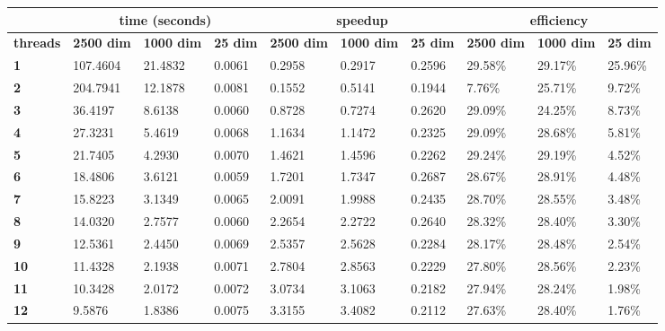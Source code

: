 \begin{table}[ht]
\centering
\begin{tabular}{l|l|l|l|l|l|l|l|l|l|}
\cline{2-10}
\multicolumn{1}{c|}{\textbf{}} & \multicolumn{3}{c|}{\textbf{time (seconds)}} & \multicolumn{3}{c|}{\textbf{speedup}} & \multicolumn{3}{c|}{\textbf{efficiency}} \\ \hline
\multicolumn{1}{|l|}{\textbf{threads}} & \textbf{2500 dim} & \textbf{1000 dim} & \textbf{25 dim} & \textbf{2500 dim} & \textbf{1000 dim} & \textbf{25 dim} & \textbf{2500 dim} & \textbf{1000 dim} & \textbf{25 dim} \\ \hline
\multicolumn{1}{|l|}{\textbf{1}} & 107.4604 & 21.4832 & 0.0061 & 0.2958 & 0.2917 & 0.2596 & 29.58\% & 29.17\% & 25.96\% \\ \hline
\multicolumn{1}{|l|}{\textbf{2}} & 204.7941 & 12.1878 & 0.0081 & 0.1552 & 0.5141 & 0.1944 & 7.76\% & 25.71\% & 9.72\% \\ \hline
\multicolumn{1}{|l|}{\textbf{3}} & 36.4197 & 8.6138 & 0.0060 & 0.8728 & 0.7274 & 0.2620 & 29.09\% & 24.25\% & 8.73\% \\ \hline
\multicolumn{1}{|l|}{\textbf{4}} & 27.3231 & 5.4619 & 0.0068 & 1.1634 & 1.1472 & 0.2325 & 29.09\% & 28.68\% & 5.81\% \\ \hline
\multicolumn{1}{|l|}{\textbf{5}} & 21.7405 & 4.2930 & 0.0070 & 1.4621 & 1.4596 & 0.2262 & 29.24\% & 29.19\% & 4.52\% \\ \hline
\multicolumn{1}{|l|}{\textbf{6}} & 18.4806 & 3.6121 & 0.0059 & 1.7201 & 1.7347 & 0.2687 & 28.67\% & 28.91\% & 4.48\% \\ \hline
\multicolumn{1}{|l|}{\textbf{7}} & 15.8223 & 3.1349 & 0.0065 & 2.0091 & 1.9988 & 0.2435 & 28.70\% & 28.55\% & 3.48\% \\ \hline
\multicolumn{1}{|l|}{\textbf{8}} & 14.0320 & 2.7577 & 0.0060 & 2.2654 & 2.2722 & 0.2640 & 28.32\% & 28.40\% & 3.30\% \\ \hline
\multicolumn{1}{|l|}{\textbf{9}} & 12.5361 & 2.4450 & 0.0069 & 2.5357 & 2.5628 & 0.2284 & 28.17\% & 28.48\% & 2.54\% \\ \hline
\multicolumn{1}{|l|}{\textbf{10}} & 11.4328 & 2.1938 & 0.0071 & 2.7804 & 2.8563 & 0.2229 & 27.80\% & 28.56\% & 2.23\% \\ \hline
\multicolumn{1}{|l|}{\textbf{11}} & 10.3428 & 2.0172 & 0.0072 & 3.0734 & 3.1063 & 0.2182 & 27.94\% & 28.24\% & 1.98\% \\ \hline
\multicolumn{1}{|l|}{\textbf{12}} & 9.5876 & 1.8386 & 0.0075 & 3.3155 & 3.4082 & 0.2112 & 27.63\% & 28.40\% & 1.76\% \\ \hline

\end{tabular}
\end{table}
